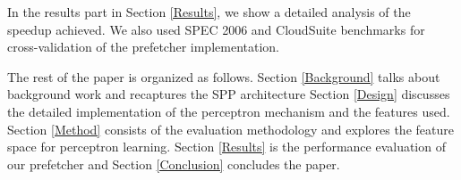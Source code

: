 In the results part in Section \ref{Results}, we show a detailed analysis of the
speedup achieved.  We also used SPEC 2006 and CloudSuite benchmarks
for cross-validation of the prefetcher implementation.

The rest of the paper is organized as follows.  Section \ref{Background} talks about
background work and recaptures the SPP architecture Section \ref{Design}
discusses the detailed implementation of the perceptron mechanism and
the features used.  Section \ref{Method} consists of the evaluation methodology
and explores the feature space for perceptron learning.  Section \ref{Results} is
the performance evaluation of our prefetcher and Section \ref{Conclusion} concludes
the paper.
